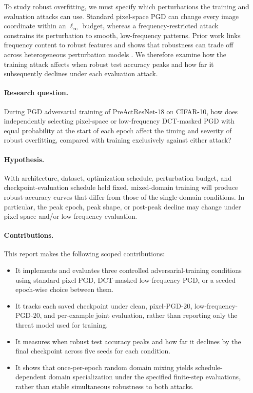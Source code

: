 \documentclass[11pt]{article}
\newcommand{\linf}{\ell_\infty}
\begin{document}
To study robust overfitting, we must specify which perturbations the training
and evaluation attacks can use. Standard pixel-space PGD
can change every image coordinate within an $\linf$ budget, whereas a
frequency-restricted attack constrains its perturbation to smooth,
low-frequency patterns. Prior work links frequency content to robust features
and shows that robustness can trade off across heterogeneous perturbation
models \cite{guo2020,bu2023,tramer2019,maini2020}. We therefore examine how the training attack affects when robust test accuracy
peaks and how far it subsequently declines under each evaluation attack.

\paragraph{Research question.}
During PGD adversarial training of PreActResNet-18 on CIFAR-10, how does
independently selecting pixel-space or low-frequency DCT-masked PGD with equal
probability at the start of each epoch affect the timing and severity of robust
overfitting, compared with training exclusively against either attack?

\paragraph{Hypothesis.}
With architecture, dataset, optimization schedule, perturbation budget, and
checkpoint-evaluation schedule held fixed, mixed-domain training will produce
robust-accuracy curves that differ from those of the single-domain conditions. In
particular, the peak epoch, peak shape, or post-peak decline may change under
pixel-space and/or low-frequency evaluation.

\paragraph{Contributions.}
This report makes the following scoped contributions:
\begin{itemize}
  \item It implements and evaluates three controlled adversarial-training
  conditions using standard pixel PGD, DCT-masked low-frequency PGD, or a
  seeded epoch-wise choice between them.
  \item It tracks each saved checkpoint under clean, pixel-PGD-20,
  low-frequency-PGD-20, and per-example joint evaluation, rather than
  reporting only the threat model used for training.
  \item It measures when robust test accuracy peaks and how far it declines
  by the final checkpoint across five seeds for each condition.
  \item It shows that once-per-epoch random domain mixing yields
  schedule-dependent domain specialization under the specified finite-step
  evaluations, rather than stable simultaneous robustness to both attacks.
\end{itemize}
\end{document}
